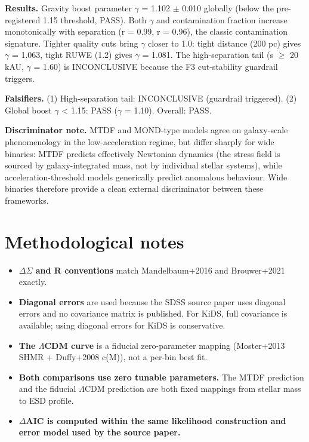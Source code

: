 \documentclass[11pt,a4paper]{article}
\begin{document}
\textbf{Results.} Gravity boost parameter $\gamma$ = 1.102 $\pm$ 0.010 globally (below the pre-registered 1.15 threshold, PASS). Both $\gamma$ and contamination fraction increase monotonically with separation (r = 0.99, r = 0.96), the classic contamination signature. Tighter quality cuts bring $\gamma$ closer to 1.0: tight distance (200 pc) gives $\gamma$ = 1.063, tight RUWE (1.2) gives $\gamma$ = 1.081. The high-separation tail (s $\ge$ 20 kAU, $\gamma$ = 1.60) is INCONCLUSIVE because the F3 cut-stability guardrail triggers.

\textbf{Falsifiers.} (1) High-separation tail: INCONCLUSIVE (guardrail triggered). (2) Global boost $\gamma$ < 1.15: PASS ($\gamma$ = 1.10). Overall: PASS.

\textbf{Discriminator note.} MTDF and MOND-type models agree on galaxy-scale phenomenology in the low-acceleration regime, but differ sharply for wide binaries: MTDF predicts effectively Newtonian dynamics (the stress field is sourced by galaxy-integrated mass, not by individual stellar systems), while acceleration-threshold models generically predict anomalous behaviour. Wide binaries therefore provide a clean external discriminator between these frameworks.

\section{Methodological notes}
\label{sec:notes}
\begin{mdframed}[linecolor=accent,linewidth=0.5pt,backgroundcolor=callout-bg,leftline=true,rightline=true,topline=true,bottomline=true,innerleftmargin=8pt,innerrightmargin=8pt,innertopmargin=6pt,innerbottommargin=6pt]
\begin{itemize}
  \item \textbf{$\Delta$$\Sigma$ and R conventions} match Mandelbaum+2016 and Brouwer+2021 exactly.
  \item \textbf{Diagonal errors} are used because the SDSS source paper uses diagonal errors and no covariance matrix is published. For KiDS, full covariance is available; using diagonal errors for KiDS is conservative.
  \item \textbf{The $\Lambda$CDM curve} is a fiducial zero-parameter mapping (Moster+2013 SHMR + Duffy+2008 c(M)), not a per-bin best fit.
  \item \textbf{Both comparisons use zero tunable parameters.} The MTDF prediction and the fiducial $\Lambda$CDM prediction are both fixed mappings from stellar mass to ESD profile.
  \item \textbf{$\Delta$AIC is computed within the same likelihood construction and error model used by the source paper.}
\end{itemize}
\end{mdframed}
\end{document}
